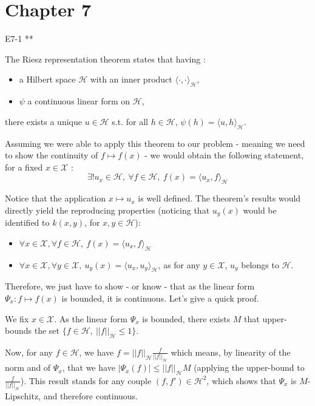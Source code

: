 \section{Chapter 7}
\begin{questions}

    \question E7-1 **

    \begin{solution}
        The Riesz representation theorem states that having :
        \begin{itemize}
            \item a Hilbert space $\mathcal{H}$ with an inner product $\langle \cdot, \cdot \rangle_\mathcal{H}$,
            \item $\psi$ a continuous linear form on $\mathcal{H}$,
        \end{itemize}
        there exists a unique $u \in \mathcal{H}$ s.t. for all $h \in \mathcal{H}$, $\psi(h) = \langle u, h \rangle_\mathcal{H}$.
        
        Assuming we were able to apply this theorem to our problem - meaning we need to show the continuity of $f \mapsto f(x)$ - we would obtain the following statement, for a fixed $x \in \mathcal{X}$ :
        $$
        \exists! u_x \in \mathcal{H}, ~\forall f \in \mathcal{H}, ~f(x) = \langle u_x, f \rangle_\mathcal{H}
        $$

        Notice that the application $x \mapsto u_x$ is well defined. The theorem's results would directly yield the reproducing properties (noticing that $u_y(x)$ would be identified to $k(x, y)$, for $x, y \in \mathcal{H}$):
        \begin{itemize}
            \item $\forall x \in \mathcal{X}, \forall f \in \mathcal{H}, ~f(x) = \langle u_x, f \rangle_\mathcal{H}$
            \item $\forall x \in \mathcal{X}, \forall y \in \mathcal{X}, ~u_y(x) = \langle u_x, u_y \rangle_\mathcal{H}$, as for any $y \in \mathcal{X}$, $u_y$ belongs to $\mathcal{H}$.
        \end{itemize}

        Therefore, we just have to show - or know - that as the linear form $\Psi_x : f \mapsto f(x)$ is bounded, it is continuous. Let's give a quick proof.

        We fix $x \in \mathcal{X}$. As the linear form $\Psi_x$ is bounded, there exists $M$ that upper-bounds the set $\{ f \in \mathcal{H},~ ||f||_\mathcal{H} \leq 1 \}$.

        Now, for any $f \in \mathcal{H}$, we have $f = ||f||_\mathcal{H} \frac{f}{||f||_\mathcal{H}}$ which means, by linearity of the norm and of $\Psi_x$, that we have $|\Psi_x(f)| \leq ||f||_\mathcal{H} M$ (applying the upper-bound to $\frac{f}{||f||_\mathcal{H}}$).
        This result stands for any couple $(f, f') \in \mathcal{H}^2$, which shows that $\Psi_x$ is $M$-Lipschitz, and therefore continuous.
    \end{solution}


\end{questions}
